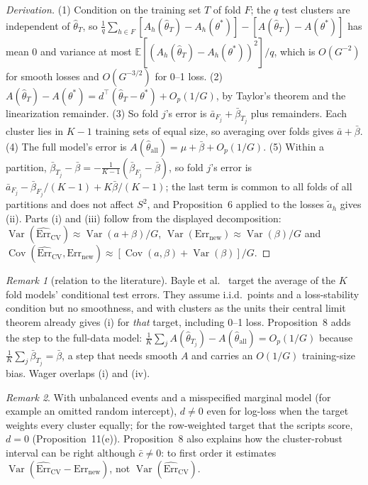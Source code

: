\documentclass[11pt]{amsart}
\theoremstyle{plain}
\theoremstyle{definition}
\theoremstyle{remark}
\newtheorem*{rem}{Remark}
\newcommand{\Var}{\operatorname{Var}}
\newcommand{\Cov}{\operatorname{Cov}}
\newcommand{\E}{\mathbb{E}}
\newcommand{\CV}{\widehat{\mathrm{Err}}_{\mathrm{CV}}}
\newcommand{\Errnew}{\mathrm{Err}_{\mathrm{new}}}
\begin{document}
\begin{proof}[Derivation]
(1) Condition on the training set $T$ of fold $F$; the $q$ test clusters are independent of $\hat\theta_T$, so $\frac1q\sum_{h\in F}[A_h(\hat\theta_T)-A_h(\theta^*)]-[A(\hat\theta_T)-A(\theta^*)]$ has mean $0$ and variance at most $\E[(A_h(\hat\theta_T)-A_h(\theta^*))^2]/q$, which is $O(G^{-2})$ for smooth losses and $O(G^{-3/2})$ for 0--1 loss. (2) $A(\hat\theta_T)-A(\theta^*)=d^\top(\hat\theta_T-\theta^*)+O_p(1/G)$, by Taylor's theorem and the linearization remainder. (3) So fold $j$'s error is $\bar a_{F_j}+\bar\beta_{T_j}$ plus remainders. Each cluster lies in $K-1$ training sets of equal size, so averaging over folds gives $\bar a+\bar\beta$. (4) The full model's error is $A(\hat\theta_{\mathrm{all}})=\mu+\bar\beta+O_p(1/G)$. (5) Within a partition, $\bar\beta_{T_j}-\bar\beta=-\frac1{K-1}(\bar\beta_{F_j}-\bar\beta)$, so fold $j$'s error is $\bar a_{F_j}-\bar\beta_{F_j}/(K-1)+K\bar\beta/(K-1)$; the last term is common to all folds of all partitions and does not affect $S^2$, and Proposition~6 applied to the losses $\tilde a_h$ gives (ii). Parts (i) and (iii) follow from the displayed decomposition: $\Var(\CV)\approx\Var(a+\beta)/G$, $\Var(\Errnew)\approx\Var(\beta)/G$ and $\Cov(\CV,\Errnew)\approx[\Cov(a,\beta)+\Var(\beta)]/G$.
\end{proof}

\begin{rem}[relation to the literature]
Bayle et al.~\cite{BBJM} target the average of the $K$ fold models' conditional test errors. They assume i.i.d.\ points and a loss-stability condition but no smoothness, and with clusters as the units their central limit theorem already gives (i) for \emph{that} target, including 0--1 loss. Proposition~8 adds the step to the full-data model: $\frac1K\sum_jA(\hat\theta_{T_j})-A(\hat\theta_{\mathrm{all}})=O_p(1/G)$ because $\frac1K\sum_j\bar\beta_{T_j}=\bar\beta$, a step that needs smooth $A$ and carries an $O(1/G)$ training-size bias. Wager \cite{Wager} overlaps (i) and (iv).
\end{rem}

\begin{rem}
With unbalanced events and a misspecified marginal model (for example an omitted random intercept), $d\neq0$ even for log-loss when the target weights every cluster equally; for the row-weighted target that the scripts score, $d=0$ (Proposition~11(e)). Proposition~8 also explains how the cluster-robust interval can be right although $\bar c\neq0$: to first order it estimates $\Var(\CV-\Errnew)$, not $\Var(\CV)$.
\end{rem}
\end{document}
